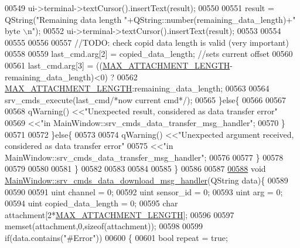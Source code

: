 \begin{DoxyCode}
{{{{{{{{{{{{{{{{{{00549                    ui->terminal->textCursor().insertText(result);
00550 
00551                    result =  QString(\textcolor{stringliteral}{"Remaining data length "}+QString::number(remaining\_data\_length)+\textcolor{stringliteral}{" byte
      \(\backslash\)n"});
00552                    ui->terminal->textCursor().insertText(result);
00553 
00554 
00555 
00556 
00557                    \textcolor{comment}{//TODO: check copid data length is valid  (very important)}
00558 
00559                    last\_cmd.arg[2] = copied\_data\_length;  \textcolor{comment}{//sets current offset}
00560 
00561                    last\_cmd.arg[3] = ((\hyperlink{a00086_aa8abe3a822c64813f7aaba3ca7e3db9c}{MAX\_ATTACHMENT\_LENGTH}-remaining\_data\_length)<0)
      ?
00562                                           \hyperlink{a00086_aa8abe3a822c64813f7aaba3ca7e3db9c}{MAX\_ATTACHMENT\_LENGTH}:remaining\_data\_length;
00563 
00564                    srv\_cmds\_execute(last\_cmd\textcolor{comment}{/*now current cmd*/});
00565                \}\textcolor{keywordflow}{else}\{
00566 
00567 
00568                    qWarning() <<\textcolor{stringliteral}{"Unexpected result, considered as data transfer error"}
00569                               <<\textcolor{stringliteral}{"in MainWindow::srv\_cmds\_data\_transfer\_msg\_handler"};
00570                \}
00571 
00572            \}\textcolor{keywordflow}{else}\{
00573 
00574                qWarning() <<\textcolor{stringliteral}{"Unexpected argument received, considered as data transfer error"}
00575                           <<\textcolor{stringliteral}{"in MainWindow::srv\_cmds\_data\_transfer\_msg\_handler"};
00576 
00577            \}
00578 
00579 
00580 
00581          \}
00582 
00583 
00584 
00585 \}
00586 
00587 
\hypertarget{a00136_source_l00588}{}\hyperlink{a00017_ac84167866950dd1eb9a29a5293546c1a}{00588} \textcolor{keywordtype}{void} \hyperlink{a00017_ac84167866950dd1eb9a29a5293546c1a}{MainWindow::srv\_cmds\_data\_download\_msg\_handler}(QString 
      data)\{
00589 
00590     
00591     uint  channel              = 0;
00592     uint  sensor\_id            = 0;
00593     uint  arg                  = 0;
00594     uint  copied\_data\_length   = 0;
00595     \textcolor{keywordtype}{char} attachment[2*\hyperlink{a00086_aa8abe3a822c64813f7aaba3ca7e3db9c}{MAX\_ATTACHMENT\_LENGTH}];
00596 
00597     memset(attachment,0,\textcolor{keyword}{sizeof}(attachment));
00598 
00599         \textcolor{keywordflow}{if}(data.contains(\textcolor{stringliteral}{"#Error"}))
00600         \{
00601              \textcolor{keywordtype}{bool} repeat = \textcolor{keyword}{true};
}}}}}}}}}}}}}}}}}}
\end{DoxyCode}

